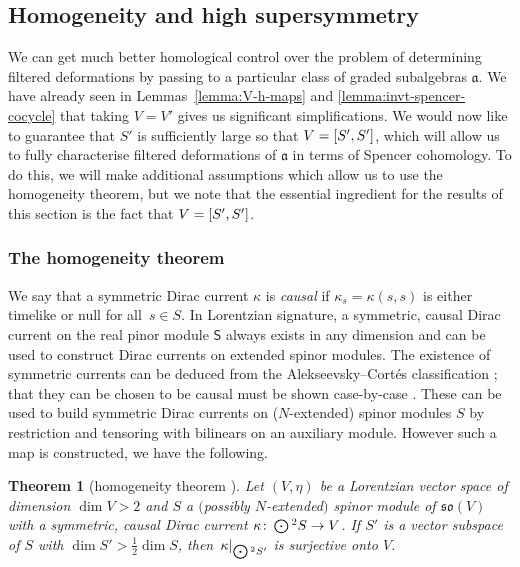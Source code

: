 \documentclass[11pt]{article}
\numberwithin{equation}{section}
\numberwithin{equation}{section}
\newtheorem{Theorem}{Theorem}[section]
\newcommand{\fa}{\mathfrak{a}}
\newcommand{\fso}{\mathfrak{so}}
\newcommand{\ssS}{\mathsf{S}}
\newcommand{\Odot}{\mathchoice{{\textstyle\bigodot}}{\bigodot}{\bigodot}{\bigodot}}
\newcommand{\1}{\mathbbm{1}}
\begin{document}
\subsection{Homogeneity and high supersymmetry}
\label{sec:homogeneity}

We can get much better homological control over the problem of determining filtered deformations by passing to a particular class of graded subalgebras $\fa$. We have already seen in Lemmas~\ref{lemma:V-h-maps} and \ref{lemma:invt-spencer-cocycle} that taking $V=V'$ gives us significant simplifications. We would now like to guarantee that $S'$ is sufficiently large so that $V=\comm{S'}{S'}$, which will allow us to fully characterise filtered deformations of $\fa$ in terms of Spencer cohomology. To do this, we will make additional assumptions which allow us to use the homogeneity theorem, but we note that the essential ingredient for the results of this section is the fact that $V=\comm{S'}{S'}$.

\subsubsection{The homogeneity theorem}

We say that a symmetric Dirac current $\kappa$ is \emph{causal} if $\kappa_s=\kappa(s,s)$ is either timelike or null for all~${s\in S}$. In Lorentzian signature, a symmetric, causal Dirac current on the real pinor module $\ssS$ always exists in any dimension and can be used to construct Dirac currents on extended spinor modules. The existence of symmetric currents can be deduced from the Alekseevsky--Cort\'es classification \cite{Alekseevsky1997}; that they can be chosen to be causal must be shown case-by-case \cite{Hustler2016}. These can be used to build symmetric Dirac currents on ($N$-extended) spinor modules $S$ by restriction and tensoring with bilinears on an auxiliary module. However such a map is constructed, we have the following.

\begin{Theorem}[homogeneity theorem \cite{Figueroa-OFarrill2012,Hustler2016}]\label{thm:homogeneity}
	Let $(V,\eta)$ be a Lorentzian vector space of dimension $\dim V>2$ and $S$ a $($possibly $N$-extended$)$ spinor module of $\fso(V)$ with a symmetric, causal Dirac current $\kappa\colon \Odot^2 S \to V$. If $S'$ is a vector subspace of $S$ with $\dim S'>\frac{1}{2}\dim S$, then~${\kappa|_{\Odot^2S'}}$ is surjective onto $V$.
\end{Theorem}
\end{document}
